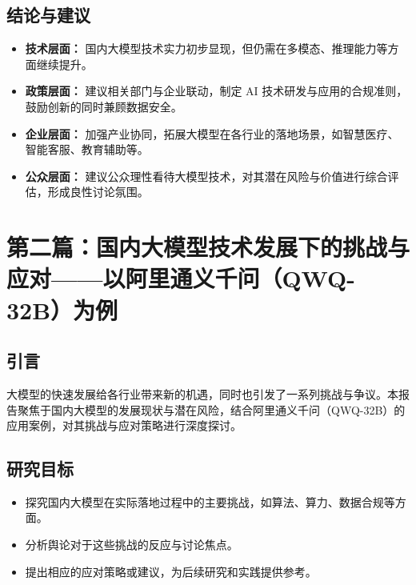 \documentclass[12pt,a4paper]{ctexart}
\begin{document}
\subsection{结论与建议}
\begin{itemize}
    \item \textbf{技术层面：} 国内大模型技术实力初步显现，但仍需在多模态、推理能力等方面继续提升。
    \item \textbf{政策层面：} 建议相关部门与企业联动，制定 AI 技术研发与应用的合规准则，鼓励创新的同时兼顾数据安全。
    \item \textbf{企业层面：} 加强产业协同，拓展大模型在各行业的落地场景，如智慧医疗、智能客服、教育辅助等。
    \item \textbf{公众层面：} 建议公众理性看待大模型技术，对其潜在风险与价值进行综合评估，形成良性讨论氛围。
\end{itemize}

\section{第二篇：国内大模型技术发展下的挑战与应对——以阿里通义千问（QWQ-32B）为例}
\subsection{引言}
大模型的快速发展给各行业带来新的机遇，同时也引发了一系列挑战与争议。本报告聚焦于国内大模型的发展现状与潜在风险，结合阿里通义千问（QWQ-32B）的应用案例，对其挑战与应对策略进行深度探讨。

\subsection{研究目标}
\begin{itemize}
    \item 探究国内大模型在实际落地过程中的主要挑战，如算法、算力、数据合规等方面。
    \item 分析舆论对于这些挑战的反应与讨论焦点。
    \item 提出相应的应对策略或建议，为后续研究和实践提供参考。
\end{itemize}
\end{document}
